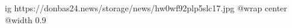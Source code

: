  
 
 
 
 

\ifcmt
  ig https://donbas24.news/storage/news/hw0wf92plp5slc17.jpg
  @wrap center
  @width 0.9
\fi
